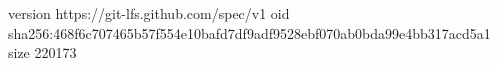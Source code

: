 version https://git-lfs.github.com/spec/v1
oid sha256:468f6c707465b57f554e10bafd7df9adf9528ebf070ab0bda99e4bb317acd5a1
size 220173

